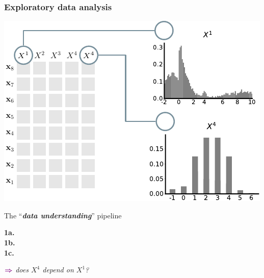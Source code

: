 \documentclass[xcolor={usenames,dvipsnames,svgnames}, compress, aspectratio=169, 11pt]{beamer}
\newcommand{\comment}[3][\small]{\begin{minipage}{1\linewidth}
          \raggedleft
          {
            $\color{violet}\boldsymbol\Rightarrow$
            #1
            {\emph{#2}}
          }
      \end{minipage}#3\\
}
\begin{document}
\begin{frame}[t, htt=bgrey2]
  \frametitle{Exploratory data analysis}

  \large
  \begin{minipage}[t]{0.6\linewidth}
    \vspace{5pt}
    \includegraphics[width=.9\linewidth]{figures/abda-hist-type}
  \end{minipage}\hfill\begin{minipage}[t]{0.4\linewidth}
    \vspace{10pt}
    {The ``\emph{\textbf{data understanding}}'' pipeline}\\[3pt]
    \raggedleft\begin{minipage}[t]{.9\linewidth}
      {\textbf{1a.} \\[-2pt]}
      {\textbf{1b.} \\[-2pt]}
      {\textbf{1c.}\hspace{1pt} \\[5pt]}
    \comment[\normalsize]{does $X^{4}$ depend on $X^{1}$?}{}
    \end{minipage}    
  \end{minipage}  
\end{frame}
\end{document}
